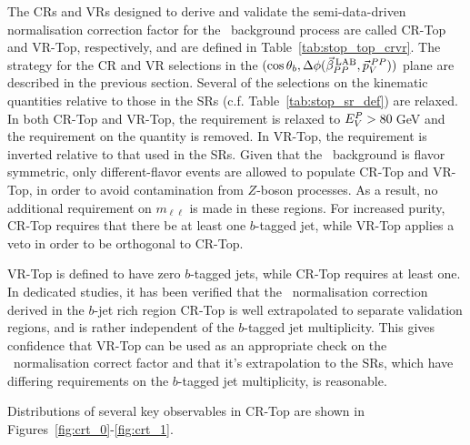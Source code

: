 The CRs and VRs designed to derive and validate the semi-data-driven
normalisation correction factor for the \ttbar~background process are called
CR-Top and VR-Top, respectively, and are defined in Table~\ref{tab:stop_top_crvr}.
The strategy for the CR and VR selections in the $(\cos\theta_b, \Delta \phi (\vec{\beta}_{PP}^{\,\text{LAB}}, \vec{p}_V^{\,PP}))$ plane are described
in the previous section.
Several of the selections on the kinematic quantities relative to those in the SRs (c.f. Table~\ref{tab:stop_sr_def})
are relaxed.
In both CR-Top and VR-Top, the \mdr requirement is relaxed to $E_V^P > 80$\,GeV and the requirement on the
\gaminv quantity is removed.
In VR-Top, the \rpt requirement is inverted relative to that used in the SRs.
Given that the \ttbar~background is flavor symmetric, only different-flavor events
are allowed to populate CR-Top and VR-Top, in order to avoid contamination from $Z$-boson processes.
As a result, no additional requirement on $m_{\ell\ell}$ is made in these regions.
For increased purity, CR-Top requires that there be at least one $b$-tagged jet,
while VR-Top applies a veto in order to be orthogonal to CR-Top.

VR-Top is defined to have zero $b$-tagged jets, while CR-Top requires at least one.
In dedicated studies, it has been verified that the \ttbar~normalisation correction derived
in the $b$-jet rich region CR-Top is well extrapolated to separate validation regions, and is rather
independent of the $b$-tagged jet multiplicity.
This gives confidence that VR-Top can be used as an appropriate check on the \ttbar~normalisation
correct factor and that it's extrapolation to the SRs, which have differing requirements on the
$b$-tagged jet multiplicity, is reasonable.

Distributions of several key observables in CR-Top are shown in Figures~\ref{fig:crt_0}-\ref{fig:crt_1}.
{\color{red}{VR-TOP DISTRIBUTIONS IN APPENDIX??}}

